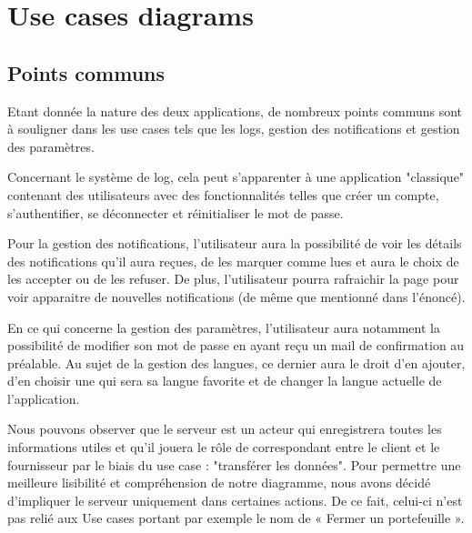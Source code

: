 \section{Use cases diagrams}
\subsection{Points communs}
Etant donnée la nature des deux applications, de nombreux points communs sont à souligner dans les use cases tels que les logs, gestion des notifications et gestion des paramètres.
\newline

\begin{flushleft}
Concernant le système de log, cela peut s'apparenter à une application "classique" contenant des utilisateurs avec des fonctionnalités telles que créer un compte, s’authentifier, se déconnecter et réinitialiser le mot de passe.
\end{flushleft}
\newline
\newline

\begin{flushleft}
Pour la gestion des notifications, l'utilisateur aura la possibilité de voir les détails des notifications qu'il aura reçues, de les marquer comme lues et aura le choix de les accepter ou de les refuser. De plus, l'utilisateur pourra rafraichir la page pour voir apparaitre de nouvelles notifications (de même que mentionné dans l'énoncé).
\end{flushleft}
\newline
\newline

\begin{flushleft}
En ce qui concerne la gestion des paramètres, l’utilisateur aura notamment la possibilité de modifier son mot de passe en ayant reçu un mail de confirmation au préalable.  Au sujet de la gestion des langues, ce dernier aura le droit d'en ajouter, d'en choisir une qui sera sa langue favorite et de changer la langue actuelle de l'application.
\end{flushleft}
\newline
\newline

\begin{flushleft}
Nous pouvons observer que le serveur est un acteur qui enregistrera toutes les informations utiles et qu’il jouera le rôle de correspondant entre le client et le fournisseur par le biais du use case : "transférer les données".
Pour permettre une meilleure lisibilité et compréhension de notre diagramme, nous avons décidé d’impliquer le serveur uniquement dans certaines actions. De ce fait, celui-ci n’est pas relié aux Use cases portant par exemple le nom de « Fermer un portefeuille ».
\end{flushleft}

